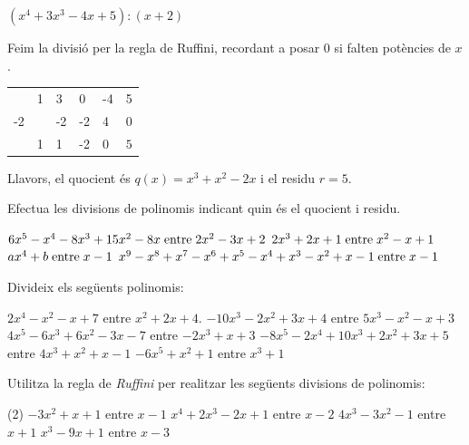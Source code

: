 \begin{resolt}[E]{
	\textbf{$(x^4+3x^3 - 4x+5):(x+2)$}
}

	Feim la divisió per la regla de Ruffini, recordant a posar 0 si falten potències de $x$.
	
	\begin{center}
		\begin{tabular}{l|lllll}	
		   & 1 & 3  & 0  & -4 & 5 \\
		-2 &   & -2	& -2 & 4 & 0 \\ \hline
		   & 1 & 1 & -2 & 0 & $\boxed{5}$
		\end{tabular} 
	\end{center}
	
	Llavors, el quocient és $q(x)=x^3+x^2-2x$ i el residu $r=5$.
\end{resolt} 
\vspace{0.75cm}

\begin{mylist}
\exer[1] Efectua les divisions de polinomis indicant quin \'{e}s el quocient i residu.
\begin{tasks}
	\task $6x^{5} -x^{4} -8x^{3} +15x^{2} -8x{\rm \; entre\; }2x^{2} -3x+2$
	\task $2x^{3} +2x+1{\rm \; entre\; }x^{2} -x+1$
	\task $ax^{4} +b{\rm \; entre\; }x-1$      
	\task $x^{9} -x^{8} +x^{7} -x^{6} +x^{5} -x^{4} +x^{3} -x^{2} +x-{\rm 1\; entre\; }x-1$  
\end{tasks}
\answers[cols=1]{[
	 $Q(x)=3x^{3}+4x^{2}-x+2$; $R(x)=-4$, 
	 $Q(x)=2x+2$;  $R(x)=2x-1$,      
    $Q(x)=a(x^{3}+ x^{2}+ x+ 1)$; $R(x)=a+b$,
       $Q(x)=x^{8}+ x^{6}+ x^{4}+ x^{2}+ 1$; $R(x)=0$
]}

	\exer  Divideix els següents polinomis:   
\begin{tasks}
	\task $2x^{4} -x^{2} -x+7$ entre $x^{2} +2x+4$.    
	\task $-10x^{3} -2x^{2} +3x+4$ entre $5x^{3} -x^{2} -x+3$
	\task $4x^{5} -6x^{3} +6x^{2} -3x-7$ entre $-2x^{3} +x+3$   
	\task $-8x^{5} -2x^{4} +10x^{3} +2x^{2} +3x+5$ entre $4x^{3} +x^{2} +x-1$ 
	\task $-6x^{5} +x^{2} +1$ entre $x^{3} +1$ 
\end{tasks}
\answers[cols=1]{[$Q=2x^2-4x-1$; $R=17x+11$, 
	$Q=-2$; $R=-4x^2+x+10$, 
	$Q=-2x^2+2$; $R=12x^2-5x-13$, 
	$Q=-2x^2+3$; $R=-3x^2+8$, 
	$Q=-6x^2$; $R=7x^2+1$
	]}


\exer  Utilitza la regla de \textit{Ruffini} per realitzar les següents divisions de polinomis:
\begin{tasks}(2)
	\task $-3x^{2} +x+1$ entre $x-1$  
	\task $x^{4} +2x^{3} -2x+1$ entre $x-2$
	\task $4x^{3} -3x^{2} -1$ entre $x+1$   
	\task $x^{3} -9x+1$ entre $x-3$ 
\end{tasks}
\answers[cols=1]{[$Q=-3x-1$; $R=-1$, 
	$Q=x^3+4x^2+8x+14$; $R=29$, 
	$Q=4x^2-7x+7$; $R=-8$, 
	$Q=x^2+3x$; $R=1$ 
	]}
 
\end{mylist}

